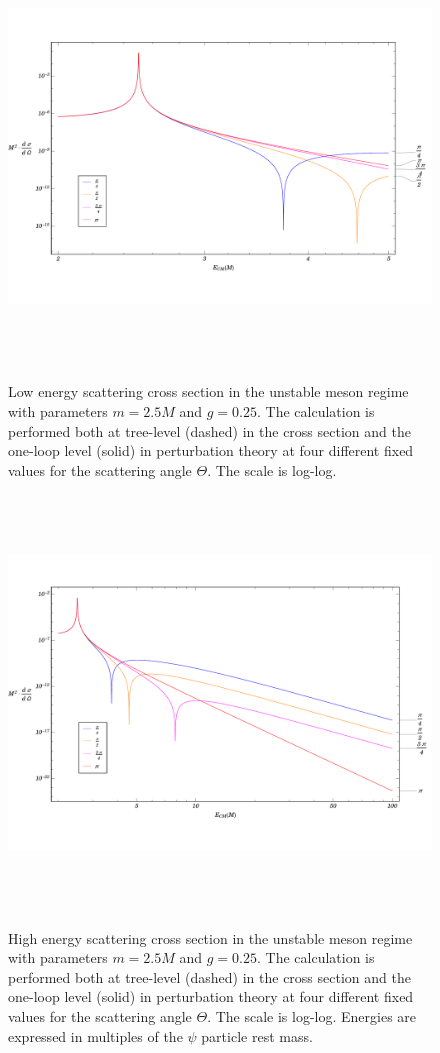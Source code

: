 \documentclass{article}
\begin{document}
\begin{figure}
\begin{center}
\vspace*{-2cm}
\includegraphics[width=15cm, height=11cm]{UnStableMeson-LowEnergy}
\caption{Low energy scattering cross section in the unstable meson regime with parameters $m = 2.5 M$ and $g = 0.25$. The calculation is performed both at tree-level (dashed) in the cross section and the one-loop level (solid) in perturbation theory at four different fixed values for the scattering angle $\Theta$. The scale is log-log.} 
\label{UnStabLowEnergy}
\includegraphics[width=15cm, height=11cm]{UnStableMeson-HighEnergy}
\caption{High energy scattering cross section in the unstable meson regime with parameters $m = 2.5 M$ and $g = 0.25$. The calculation is performed both at tree-level (dashed) in the cross section and the one-loop level (solid) in perturbation theory at four different fixed values for the scattering angle $\Theta$. The scale is log-log. Energies are expressed in multiples of the $\psi$ particle rest mass.} 
\label{UnStabHighEnergy}
\end{center}
\end{figure} 
\end{document}
